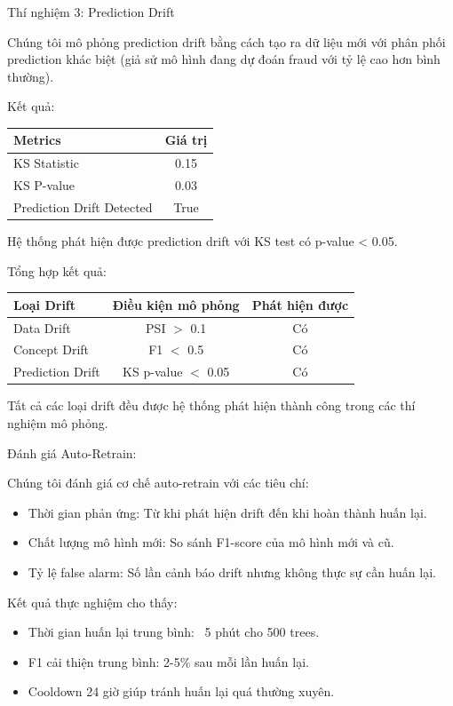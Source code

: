 Thí nghiệm 3: Prediction Drift

Chúng tôi mô phỏng prediction drift bằng cách tạo ra dữ liệu mới với phân phối prediction khác biệt (giả sử mô hình đang dự đoán fraud với tỷ lệ cao hơn bình thường).

Kết quả:
\begin{center}
\begin{tabular}{l|c}
    \textbf{Metrics} & \textbf{Giá trị} \\
    \hline
    KS Statistic & 0.15 \\
    KS P-value & 0.03 \\
    Prediction Drift Detected & True \\
\end{tabular}
\end{center}

Hệ thống phát hiện được prediction drift với KS test có p-value < 0.05.

Tổng hợp kết quả:

\begin{center}
\begin{tabular}{l|c|c}
    \textbf{Loại Drift} & \textbf{Điều kiện mô phỏng} & \textbf{Phát hiện được} \\
    \hline
    Data Drift & PSI $>$ 0.1 & Có \\
    Concept Drift & F1 $<$ 0.5 & Có \\
    Prediction Drift & KS p-value $<$ 0.05 & Có \\
\end{tabular}
\end{center}

Tất cả các loại drift đều được hệ thống phát hiện thành công trong các thí nghiệm mô phỏng.

Đánh giá Auto-Retrain:

Chúng tôi đánh giá cơ chế auto-retrain với các tiêu chí:
\begin{itemize}
    \item Thời gian phản ứng: Từ khi phát hiện drift đến khi hoàn thành huấn lại.
    \item Chất lượng mô hình mới: So sánh F1-score của mô hình mới và cũ.
    \item Tỷ lệ false alarm: Số lần cảnh báo drift nhưng không thực sự cần huấn lại.
\end{itemize}

Kết quả thực nghiệm cho thấy:
\begin{itemize}
    \item Thời gian huấn lại trung bình: ~5 phút cho 500 trees.
    \item F1 cải thiện trung bình: 2-5\% sau mỗi lần huấn lại.
    \item Cooldown 24 giờ giúp tránh huấn lại quá thường xuyên.
\end{itemize}

